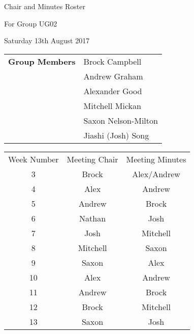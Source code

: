 \documentclass{article}
\begin{document}
\begin{center}    
{\huge Chair and Minutes Roster \par}
\vspace{0.5cm}
{\large For Group UG02 \par}
\vspace{0.5cm}
{\large Saturday 13th August 2017 \par}
\vspace{0.5cm}
\end{center}

\begin{flushleft}
\begin{tabular}{ll}
{\bfseries Group Members} & Brock Campbell \\
 & Andrew Graham \\
 & Alexander Good \\
 & Mitchell Mickan \\
 & Saxon Nelson-Milton \\
 & Jiashi (Josh) Song \\
\end{tabular}
\end{flushleft}

\begin{table}[h]
\centering
\begin{tabular}{| c | c | c |}

\hline
  Week Number & Meeting Chair & Meeting Minutes  \\
  3 & Brock & Alex/Andrew  \\
  4 & Alex & Andrew  \\
  5 & Andrew & Brock  \\
  6 & Nathan & Josh \\
  7 & Josh & Mitchell  \\
  8 & Mitchell & Saxon  \\
  9 & Saxon & Alex  \\
  10 & Alex & Andrew  \\
  11 & Andrew & Brock  \\
  12 & Brock & Mitchell  \\
  13 & Saxon & Josh  \\
\hline
\end{tabular}
\end{table}
\end{document}
